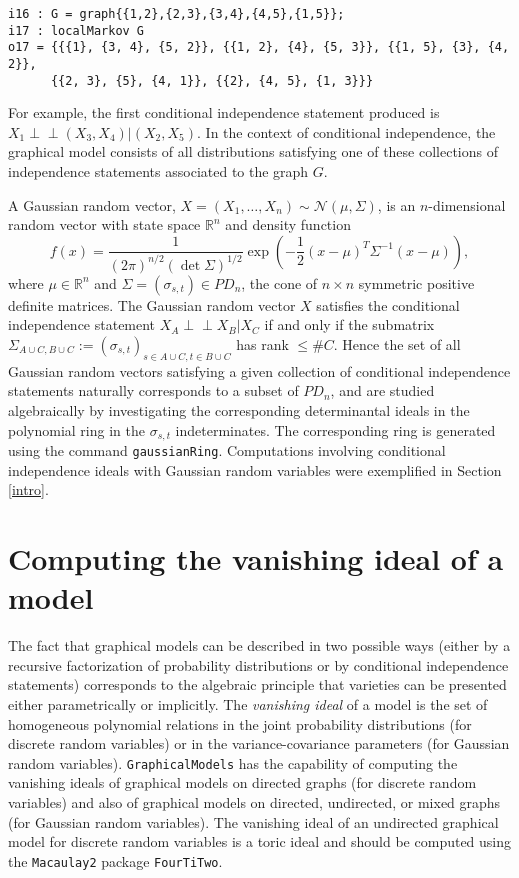 \documentclass[letterpaper]{article}
\theoremstyle{plain}
\theoremstyle{definition}
\def\ci{\perp\!\!\!\perp}
\begin{document}
\begin{verbatim}
i16 : G = graph{{1,2},{2,3},{3,4},{4,5},{1,5}};
i17 : localMarkov G
o17 = {{{1}, {3, 4}, {5, 2}}, {{1, 2}, {4}, {5, 3}}, {{1, 5}, {3}, {4, 2}}, 
      {{2, 3}, {5}, {4, 1}}, {{2}, {4, 5}, {1, 3}}}
\end{verbatim}

For example, the first conditional independence statement produced
is $X_{1} \ci (X_{3}, X_{4}) | (X_{2}, X_{5})$.  In the 
context of conditional independence, the graphical model
consists of all distributions satisfying one of these collections
of independence statements associated to the graph $G$.

A Gaussian random vector, $X = (X_{1}, \ldots, X_{n}) 
\sim \mathcal{N}(\mu, \Sigma)$, is an
$n$-dimensional random vector with state space $\mathbb{R}^{n}$ and
density function
$$
f(x)  =  \frac{1}{(2 \pi)^{n/2}(\det \Sigma)^{1/2} } 
\exp\left( - \frac{1}{2} (x- \mu)^{T} \Sigma^{{-1}} (x - \mu) \right), 
$$
where $\mu \in \mathbb{R}^{n}$ and $\Sigma = (\sigma_{s,t}) \in PD_{n}$, the cone of 
$n \!\times\! n$ symmetric positive definite matrices.  The Gaussian random vector
$X$ satisfies the conditional independence statement $X_{A} \ci X_{B} | X_{C}$
if and only if the submatrix 
$\Sigma_{A \cup C, B \cup C}  := 
(\sigma_{s,t})_{s \in A \cup C, t \in B \cup C}$ has rank $\leq \#C$.
Hence the set of all Gaussian random vectors satisfying a given
collection of conditional independence statements naturally corresponds
to a subset of $PD_{n}$, and are studied algebraically by investigating  the 
corresponding determinantal ideals in the polynomial ring
in the $\sigma_{s,t}$ indeterminates.  The corresponding ring
is generated using the command {\tt gaussianRing}.
Computations involving conditional independence ideals with
Gaussian random variables were exemplified in Section \ref{intro}. 



\section{Computing the vanishing ideal of a model}

The fact that graphical models can be described in two possible ways (either by a recursive
factorization of probability distributions or by conditional independence
statements) corresponds to the algebraic principle that varieties can be presented either
parametrically or implicitly. The \emph{vanishing ideal} of a model is the set
of homogeneous polynomial relations in the joint probability distributions (for discrete
random variables) or in the variance-covariance parameters (for Gaussian
random variables).
{\tt GraphicalModels} has the capability of computing the vanishing ideals
of graphical models on directed graphs (for discrete random variables) and also
of graphical models on directed, undirected, or  mixed
graphs (for Gaussian random variables).  The vanishing ideal
of an undirected graphical model for discrete random variables is
a toric ideal and
should be computed using the {\tt Macaulay2} package {\tt FourTiTwo}.
\end{document}
